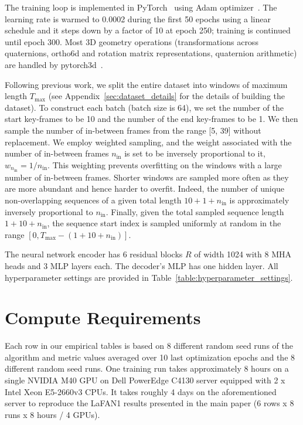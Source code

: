 \documentclass[letterpaper]{article} \usepackage[]{aaai23}  \usepackage{times}  \usepackage{helvet}  \usepackage{courier}  \usepackage[hyphens]{url}  \usepackage{graphicx} \urlstyle{rm} \def\UrlFont{\rm}  \usepackage{natbib}  \usepackage{caption} \frenchspacing  \setlength{\pdfpagewidth}{8.5in} \setlength{\pdfpageheight}{11in}
\begin{document}
The training loop is implemented in PyTorch~\cite{paszke2019pytorch} using Adam optimizer~\cite{kingma2015adam}. The learning rate is warmed to 0.0002 during the first 50 epochs using a linear schedule and it steps down by a factor of 10 at epoch 250; training is continued until epoch 300. Most 3D geometry operations (transformations across quaternions, ortho6d and rotation matrix representations, quaternion arithmetic) are handled by pytorch3d~\citep{ravi2020pytorch3d}. 

Following previous work, we split the entire dataset into windows of maximum length $T_{\max}$ (see Appendix~\ref{sec:dataset_details} for the details of building the dataset). To construct each batch (batch size is 64), we set the number of the start key-frames to be 10 and the number of the end key-frames to be 1. We then sample the number of in-between frames from the range [5, 39] without replacement. We employ weighted sampling, and the weight associated with the number of in-between frames $n_{\textrm{in}}$ is set to be inversely proportional to it, $w_{n_{\textrm{in}}} = 1 / n_{\textrm{in}}$. This weighting prevents overfitting on the windows with a large number of in-between frames. Shorter windows are sampled more often as they are more abundant and hence harder to overfit. Indeed, the number of unique non-overlapping sequences of a given total length $10 + 1 + n_{\textrm{in}}$ is approximately inversely proportional to $n_{\textrm{in}}$. Finally, given the total sampled sequence length $1+10+n_{\textrm{in}}$, the sequence start index is sampled uniformly at random in the range $[0, T_{\max}-(1+10+n_{\textrm{in}})]$.

The neural network encoder has 6 residual blocks $R$ of width 1024 with 8 MHA heads and 3 MLP layers each. The decoder's MLP has one hidden layer. All hyperparameter settings are provided in Table~\ref{table:hyperparameter_settings}. 

\section{Compute Requirements}\label{sec:compute}

Each row in our empirical tables is based on 8 different random seed runs of the algorithm and metric values averaged over 10 last optimization epochs and the 8 different random seed runs. One training run takes approximately 8 hours on a single NVIDIA M40 GPU on Dell PowerEdge C4130 server equipped  with 2 x Intel Xeon E5-2660v3 CPUs. It takes roughly 4 days on the aforementioned server to reproduce the LaFAN1 results presented in the main paper (6 rows x 8 runs x 8 hours / 4 GPUs).
\end{document}
